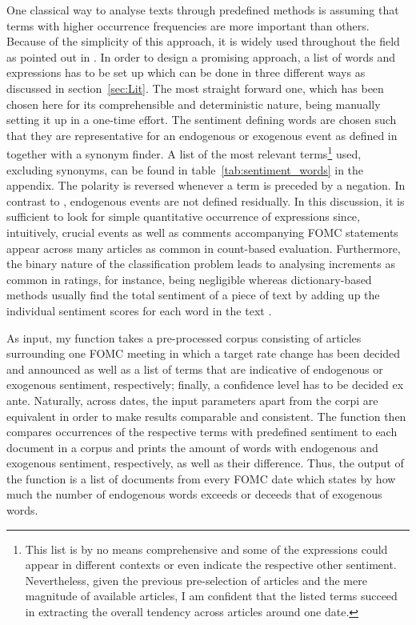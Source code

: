 One classical way to analyse texts through predefined methods is assuming that terms with higher occurrence frequencies are more important than others. Because of the simplicity of this approach, it is widely used throughout the field as pointed out in \textcite{Meyer.2008}. In order to design a promising approach, a list of words and expressions has to be set up which can be done in three different ways as discussed in section~\ref{sec:Lit}. The most straight forward one, which has been chosen here for its comprehensible and deterministic nature, being manually setting it up in a one-time effort. The sentiment defining words are chosen such that they are representative for an endogenous or exogenous event as defined in \textcite{Ellingsen.2003} together with a synonym finder. A list of the most relevant terms\footnote{This list is by no means comprehensive and some of the expressions could appear in different contexts or even indicate the respective other sentiment. Nevertheless, given the previous pre-selection of articles and the mere magnitude of available articles, I am confident that the listed terms succeed in extracting the overall tendency across articles around one date.} used, excluding synonyms, can be found in table~\vref{tab:sentiment_words} in the appendix. The polarity is reversed whenever a term is preceded by a negation. In contrast to \textcite{Ellingsen.2003}, endogenous events are not defined residually.
In this discussion, it is sufficient to look for simple quantitative occurrence of expressions since, intuitively, crucial events as well as comments accompanying FOMC statements appear across many articles as common in count-based evaluation. Furthermore, the binary nature of the classification problem leads to analysing increments as common in ratings, for instance, being negligible whereas dictionary-based methods usually find the total sentiment of a piece of text by adding up the individual sentiment scores for each word in the text \parencite{Silge.2017}. 

As input, my function takes a pre-processed corpus consisting of articles surrounding one FOMC meeting in which a target rate change has been decided and announced as well as a list of terms that are indicative of endogenous or exogenous sentiment, respectively; finally, a confidence level has to be decided ex ante. Naturally, across dates, the input parameters apart from the corpi are equivalent in order to make results comparable and consistent. The function then compares occurrences of the respective terms with predefined sentiment to each document in a corpus and prints the amount of words with endogenous and exogenous sentiment, respectively, as well as their difference. Thus, the output of the function is a list of documents from every FOMC date which states by how much the number of endogenous words exceeds or deceeds that of exogenous words. 

